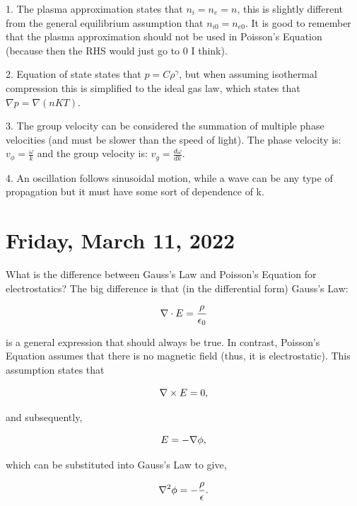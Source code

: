 \documentclass[12pt]{article}
\begin{document}
\par
1. The plasma approximation states that $n_i = n_e = n$, this is slightly different from the general equilibrium assumption that $n_{i0} = n_{e0}$. It is good to remember that the plasma approximation should not be used in Poisson's Equation (because then the RHS would just go to 0 I think).
\par
2. Equation of state states that $p = C\rho^\gamma$, but when assuming isothermal compression this is simplified to the ideal gas law, which states that $\nabla p = \nabla (nKT)$. 
\par
3. The group velocity can be considered the summation of multiple phase velocities (and must be slower than the speed of light). The phase velocity is: $v_\phi = \frac{\omega}{k}$ and the group velocity is: $v_g = \frac{d\omega}{dk}$.
\par
4. An oscillation follows sinusoidal motion, while a wave can be any type of propagation but it must have some sort of dependence of k. 


\section{Friday, March 11, 2022}

\par
What is the difference between Gauss's Law and Poisson's Equation for electrostatics? The big difference is that (in the differential form) Gauss's Law:

\begin{equation}
\centering
\nabla \cdot E = \frac{\rho}{\epsilon_0}
\end{equation}

is a general expression that should always be true. In contrast, Poisson's Equation assumes that there is no magnetic field (thus, it is electrostatic). This assumption states that 

\begin{equation}
\centering
\nabla \times E = 0,
\end{equation}

and subsequently,

\begin{equation}
\centering
E = - \nabla \phi,
\end{equation}

which can be substituted into Gauss's Law to give,

\begin{equation}
\centering
\nabla^2\phi = -\frac{\rho}{\epsilon}.
\end{equation}
\end{document}
